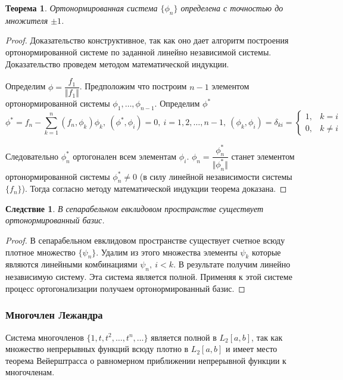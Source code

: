 \documentclass[14pt,a4paper]{extarticle}
\newtheorem{theorem}{Теорема}[section]
\newtheorem{corollary}{Следствие}[theorem]
\theoremstyle{definition}
\theoremstyle{remark}
\renewcommand{\[}{\begin{dmath*}[compact]}
\renewcommand{\]}{\end{dmath*}}
\newcommand{\sep}{ , \ \allowbreak }
\newcommand\f[2]{\dfrac{#1}{#2}}
\begin{document}
\begin{theorem}
  Ортонормированная система $\{\phi_n\}$ определена с точностью
  до множителя $\pm 1$.
\end{theorem}

\begin{proof}
  Доказательство конструктивное, так как оно дает алгоритм построения
  ортонормированной системе по заданной линейно независимой системы.
  Доказательство проведем методом математической индукции.

  Определим $\phi = \f{f_1}{\Vert f_1 \Vert}$.
  Предположим что построим $n-1$ элементом ортонормированной системы
  $\phi_1, \dots, \phi_{n-1}$. Определим $\phi^*$
  \[\phi^* = f_n - \sum_{k=1}^n (f_n,\phi_k) \phi_k \sep
  {(\phi^* , \phi_i) = 0} \sep {i=1,2,\dots, n-1} \sep
  (\phi_k, \phi_i) = \delta_{ki} \allowbreak
  = \begin{cases} 1, & k=i \\ 0, & k\neq i \end{cases}\]

  Следовательно $\phi_n^*$ ортогонален всем элементам $\phi_i$.
  $\phi_n = \f{\phi_n^*}{\Vert \phi_n^* \Vert}$
  станет элементом ортонормированной системы $\phi_n^* \neq 0$
  (в силу линейной независимости системы $\{f_n\}$).
  Тогда согласно методу математической индукции теорема доказана.
\end{proof}

\begin{corollary}
В сепарабельном евклидовом пространстве существует ортонормированный базис.
\end{corollary}

\begin{proof}
В сепарабельном евклидовом пространстве существует счетное всюду
плотное множество $\{\psi_n\}$.
Удалим из этого множества элементы $\psi_k$ которые являются
линейными комбинациями $\psi_n \sep i<k$. В результате получим
линейно независимую систему.
Эта система является полной.
Применяя к этой системе процесс ортогонализации получаем
ортонормированный базис.
\end{proof}

\subsubsection{Многочлен Лежандра}

Система многочленов $\{1,t,t^2,\dots, t^n,\dots\}$ является полной
в $L_2[a,b]$,
так как множество непрерывных функций всюду плотно в $L_2[a,b]$ и имеет
место теорема Вейерштрасса о равномерном приближении непрерывной
функции к многочленам.
\end{document}
